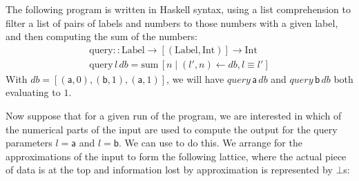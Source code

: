 \begin{example}
  \label{ex:introduction-example}
  The following program is written in Haskell \cite{haskell} syntax, using a list comprehension to filter a list of pairs of labels and numbers to those numbers with a given label, and then computing the sum of the numbers:
  \begin{displaymath}
    \begin{array}{l}
      \mathrm{query} :: \mathrm{Label} \to [(\mathrm{Label}, \mathrm{Int})] \to \mathrm{Int} \\
      \mathrm{query}\,l\,\mathit{db} = \mathrm{sum}\,[ n \mid (l',n) \leftarrow \mathit{db}, l \equiv l' ]
    \end{array}
  \end{displaymath}
  With $\mathit{db} = [(\mathsf{a}, 0), (\mathsf{b}, 1), (\mathsf{a}, 1)]$, we will have $\mathit{query}\,\mathsf{a}\,\mathit{db}$ and $\mathit{query}\,\mathsf{b}\,\mathit{db}$ both evaluating to $1$.

  Now suppose that for a given run of the program, we are interested in which of the numerical parts of the input are used to compute the output for the query parameters $l = \mathsf{a}$ and $l = \mathsf{b}$. We can use \GPS to do this. We arrange for the approximations of the input to form the following lattice, where the actual piece of data is at the top and information lost by approximation is represented by $\bot$s:
  \begin{center}
\end{center}
\end{example}
